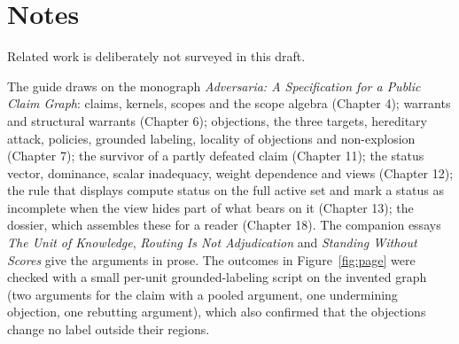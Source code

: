 \documentclass[11pt]{article}
\begin{document}
\section*{Notes}


Related work is deliberately not surveyed in this draft.

The guide draws on the monograph \emph{Adversaria: A Specification for a Public Claim Graph}: claims, kernels, scopes and the scope algebra (Chapter 4); warrants and structural warrants (Chapter 6); objections, the three targets, hereditary attack, policies, grounded labeling, locality of objections and non-explosion (Chapter 7); the survivor of a partly defeated claim (Chapter 11); the status vector, dominance, scalar inadequacy, weight dependence and views (Chapter 12); the rule that displays compute status on the full active set and mark a status as incomplete when the view hides part of what bears on it (Chapter 13); the dossier, which assembles these for a reader (Chapter 18). The companion essays \emph{The Unit of Knowledge}, \emph{Routing Is Not Adjudication} and \emph{Standing Without Scores} give the arguments in prose. The outcomes in Figure~\ref{fig:page} were checked with a small per-unit grounded-labeling script on the invented graph (two arguments for the claim with a pooled argument, one undermining objection, one rebutting argument), which also confirmed that the objections change no label outside their regions.
\end{document}
